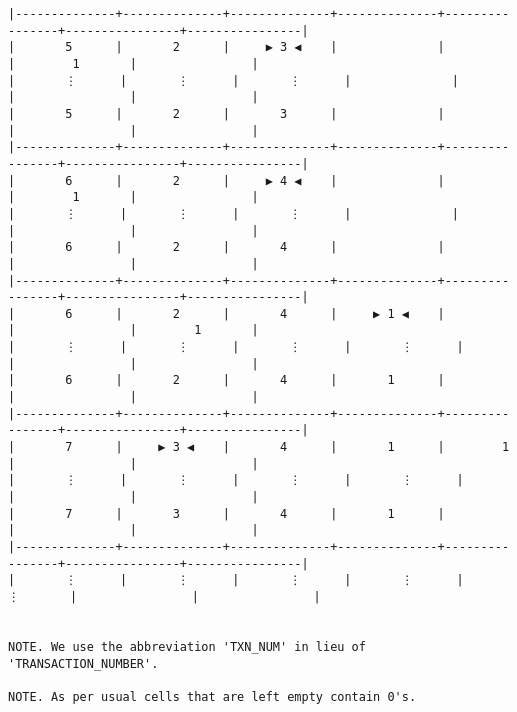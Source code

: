 \documentclass[varwidth=\maxdimen,margin=0.5cm,multi={verbatim}]{standalone}
\begin{document}
\begin{verbatim}
|--------------+--------------+--------------+--------------+----------------+----------------+----------------|
|       5      |       2      |     ▶ 3 ◀    |              |                |        1       |                |
|       ⋮      |       ⋮      |       ⋮      |              |                |                |                |
|       5      |       2      |       3      |              |                |                |                |
|--------------+--------------+--------------+--------------+----------------+----------------+----------------|
|       6      |       2      |     ▶ 4 ◀    |              |                |        1       |                |
|       ⋮      |       ⋮      |       ⋮      |              |                |                |                |
|       6      |       2      |       4      |              |                |                |                |
|--------------+--------------+--------------+--------------+----------------+----------------+----------------|
|       6      |       2      |       4      |     ▶ 1 ◀    |                |                |        1       |
|       ⋮      |       ⋮      |       ⋮      |       ⋮      |                |                |                |
|       6      |       2      |       4      |       1      |                |                |                |
|--------------+--------------+--------------+--------------+----------------+----------------+----------------|
|       7      |     ▶ 3 ◀    |       4      |       1      |        1       |                |                |
|       ⋮      |       ⋮      |       ⋮      |       ⋮      |                |                |                |
|       7      |       3      |       4      |       1      |                |                |                |
|--------------+--------------+--------------+--------------+----------------+----------------+----------------|
|       ⋮      |       ⋮      |       ⋮      |       ⋮      |        ⋮       |                |                |


NOTE. We use the abbreviation 'TXN_NUM' in lieu of 'TRANSACTION_NUMBER'.

NOTE. As per usual cells that are left empty contain 0's.

\end{verbatim}
\end{document}
